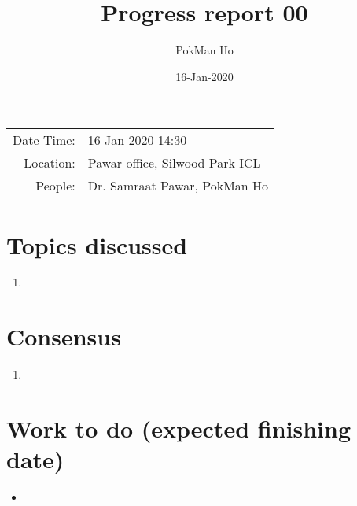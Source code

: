 \documentclass[a4paper,11pt]{article}
\title{Progress report 00}
\author{PokMan Ho}
\date{16-Jan-2020}
\begin{document}
    \maketitle
    
    \begin{tabular}{rl}
        Date Time: & 16-Jan-2020 14:30 \\
        Location: & Pawar office, Silwood Park ICL \\
        People: & Dr. Samraat Pawar, PokMan Ho \\
    \end{tabular}
    \section{Topics discussed}
    \begin{enumerate}
        \item 
    \end{enumerate}
    \section{Consensus}
    \begin{enumerate}
        \item 
    \end{enumerate}
    \section{Work to do (expected finishing date)}
    \begin{itemize}
        \item 
    \end{itemize}
\end{document}
